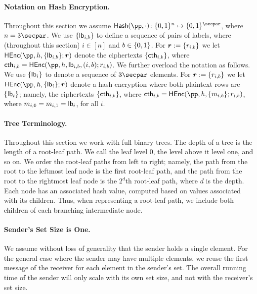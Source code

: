 \paragraph{Notation on Hash Encryption.}  Throughout this section we assume $\Hash(\pp, \cdot) \colon \bits^{n} \mapsto \bits^\secpar$, where $n = 3 \secpar$.  We use $\{\mathsf{lb}_{i,b} \}$ to define a sequence of pairs of labels, where (throughout this section) $i \in [n]$  and $b \in \{0,1\}$.  For $\boldsymbol{r} := \{r_{i,b} \}$ we let $\HEnc(\pp, h, \{\lb_{i,b} \} ; \bo{r})$  denote the  ciphertexts $\{\mathsf{cth}_{i,b} \}$, where $\cth_{i,b} = \HEnc(\pp, h, \lb_{i,b} , (i,b); r_{i,b})$. 
 We further overload the  notation as follows. We use $\{ \mathsf{lb}_i \}$ to denote a sequence of $3 \secpar$ elements. For  $\boldsymbol{r} := \{r_{i,b} \}$ we let $\HEnc(\pp, h, \{\lb_{i} \} ; \bo{r})$  denote a hash encryption where both plaintext rows are $\{\mathsf{lb}_i\}$; namely,    the  ciphertexts $\{\mathsf{cth}_{i,b} \}$, where $\cth_{i,b} = \HEnc(\pp, h, \{ m_{i,b}\}; r_{i,b})$, where $m_{i,0} = m_{i,1} = \mathsf{lb}_i$, for all $i$. %

\paragraph{Tree Terminology.} Throughout this section we work with full binary trees. The depth of a tree is the length of a root-leaf path. We call the leaf level  0, the level above it level one, and so on. We order the root-leaf paths from left to right; namely, the path from the root to the leftmost leaf node is the first root-leaf path, and the path from the root to the rightmost leaf node is the $2^d$th root-leaf path, where $d$ is the depth. Each node has an associated hash value, computed based on values associated with its children. Thus, when representing a root-leaf path, we  include both children of each branching intermediate node.

\paragraph{Sender's Set Size is One.} We assume without loss of generality that the sender holds a single element. For the general case where the sender may have multiple elements, we reuse the first message of the receiver for each element in the sender's set. The overall running time of the sender will only scale with its own set size, and not with the receiver's set size. 

  
  
